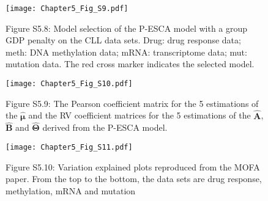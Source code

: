 \begin{figure}[htbp]
    \centering
    \texttt{[image: Chapter5\_Fig\_S9.pdf]}
    \caption*{Figure S5.8: Model selection of the P-ESCA model with a group GDP penalty on the CLL data sets. Drug: drug response data; meth: DNA methylation data; mRNA: transcriptome data; mut: mutation data. The red cross marker indicates the selected model.}
	\label{chapter5_fig:S9}
\end{figure}

\begin{figure}[htbp]
    \centering
    \texttt{[image: Chapter5\_Fig\_S10.pdf]}
    \caption*{Figure S5.9: The Pearson coefficient matrix for the 5 estimations of the $\hat{\bm{\mu}}$ and the RV coefficient matrices for the 5 estimations of the $\hat{\mathbf{A}}$, $\hat{\mathbf{B}}$ and $\hat{\mathbf{\Theta}}$ derived from the P-ESCA model.}
	\label{chapter5_fig:S10}
\end{figure}

\begin{figure}[htbp]
    \centering
    \texttt{[image: Chapter5\_Fig\_S11.pdf]}
    \caption*{Figure S5.10: Variation explained plots reproduced from the MOFA paper. From the top to the bottom, the data sets are drug response, methylation, mRNA and mutation}
	\label{chapter5_fig:S11}
\end{figure}

